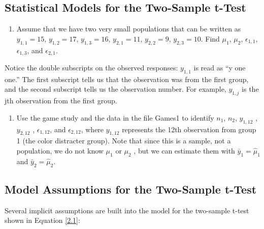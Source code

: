 \documentclass[
]{report}
\providecommand{\tightlist}{%
  \setlength{\itemsep}{0pt}\setlength{\parskip}{0pt}}
\begin{document}
\subsection{Statistical Models for the Two-Sample t-Test}\label{statistical-models-for-the-two-sample-t-test}

\begin{enumerate}
\def\labelenumi{\arabic{enumi}.}
\setcounter{enumi}{4}
\tightlist
\item
  Assume that we have two very small populations that can be written as
  \(y_{1,1} = 15\), \(y_{1,2} = 17\), \(y_{1,3} = 16\), \(y_{2,1} = 11\), \(y_{2,2} = 9\), \(y_{2,3} = 10\). Find \(\mu_1\), \(\mu_2\), \(\epsilon_{1, 1}\), \(\epsilon_{1, 3}\), and \(\epsilon_{2, 1}\).
\end{enumerate}

Notice the double subscripts on the observed responses: \(y_{1,1}\) is read as ``y one one.'' The first subscript tells us that the observation was from the first group, and the second subscript tells us the observation number. For example, \(y_{1,j}\) is the jth observation from the first group.

\begin{enumerate}
\def\labelenumi{\arabic{enumi}.}
\setcounter{enumi}{5}
\tightlist
\item
  Use the game study and the data in the file Games1 to identify \(n_1\), \(n_2\), \(y_{1,12}\) , \(y_{2,12}\) , \(\epsilon_{1, 12}\), and \(\epsilon_{2, 12}\),
  where \(y_{1,12}\) represents the 12th observation from group 1 (the color distracter group). Note that since this is a sample, not a population, we do not know \(\mu_1\) or \(\mu_2\) , but we can estimate them with \(\bar{y}_1 = \hat{\mu}_1\) and \(\bar{y}_2 = \hat{\mu}_2\).
\end{enumerate}

\subsection{Model Assumptions for the Two-Sample t-Test}\label{model-assumptions-for-the-two-sample-t-test}

Several implicit assumptions are built into the model for the two-sample t-test shown in Equation \ref{2.1}:
\end{document}
